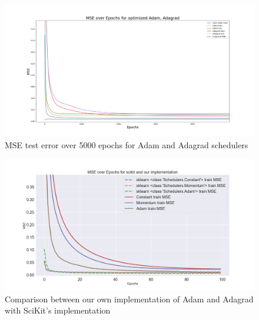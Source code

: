 \documentclass[onecolumn,10pt,cleanfoot]{asme2ej}
\begin{document}
\begin{figure}[H]
\centerline{\includegraphics[width=8in]{figure/5000e_adam_v_adagrad.png}}
\caption{MSE test error over 5000 epochs for Adam and Adagrad schedulers}
\label{adam_v_adagrad}
\end{figure}

\begin{figure}[H]
\centerline{\includegraphics[width=7in]{figure/scikit_compare.png}}
\caption{Comparison between our own implementation of Adam and Adagrad with SciKit's implementation}
\label{scikitcompare}
\end{figure}
\end{document}
